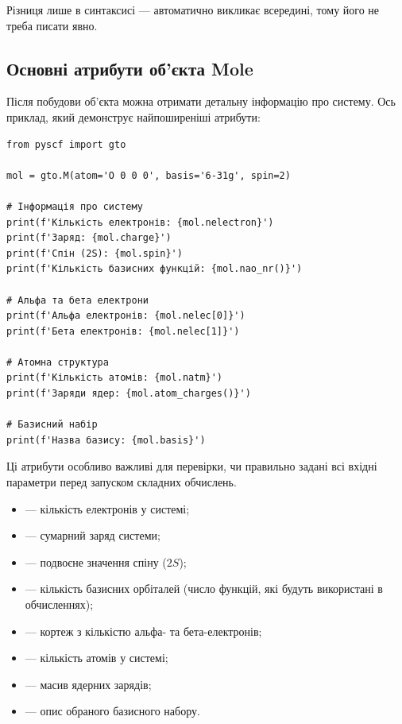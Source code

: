Різниця лише в синтаксисі ---  автоматично викликає
 всередині, тому його не треба писати явно.

\subsection{Основні атрибути об'єкта Mole}

Після побудови об'єкта можна отримати детальну інформацію про систему.
Ось приклад, який демонструє найпоширеніші атрибути:
\begin{verbatim}
from pyscf import gto

mol = gto.M(atom='O 0 0 0', basis='6-31g', spin=2)

# Інформація про систему
print(f'Кількість електронів: {mol.nelectron}')
print(f'Заряд: {mol.charge}')
print(f'Спін (2S): {mol.spin}')
print(f'Кількість базисних функцій: {mol.nao_nr()}')

# Альфа та бета електрони
print(f'Альфа електронів: {mol.nelec[0]}')
print(f'Бета електронів: {mol.nelec[1]}')

# Атомна структура
print(f'Кількість атомів: {mol.natm}')
print(f'Заряди ядер: {mol.atom_charges()}')

# Базисний набір
print(f'Назва базису: {mol.basis}')
\end{verbatim}

\noindent
Ці атрибути особливо важливі для перевірки, чи правильно задані всі вхідні параметри перед запуском складних обчислень.

\begin{itemize}
	\item {} --- кількість електронів у системі;
	\item {} --- сумарний заряд системи;
	\item {} --- подвоєне значення спіну ($2S$);
	\item {} --- кількість базисних орбіталей (число функцій, які будуть використані в обчисленнях);
	\item {} --- кортеж  з кількістю альфа- та бета-елек\-тро\-нів;
	\item {} --- кількість атомів у системі;
	\item {} --- масив ядерних зарядів;
	\item {} --- опис обраного базисного набору.
\end{itemize}

